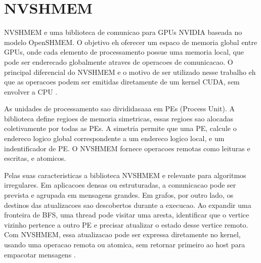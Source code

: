 \documentclass{article}
\begin{document}
\section{NVSHMEM}
NVSHMEM e uma biblioteca de comunicao para GPUs NVIDIA baseada no modelo OpenSHMEM. 
O objetivo eh oferecer um espaco de memoria global entre GPUs, onde cada elemento de 
processamento possue uma memoria local, que pode ser enderecado globalmente atraves de
operacoes de comunicacao. O principal diferencial do NVSHMEM e o motivo de ser utilizado
nesse trabalho eh que as operacoes podem ser emitidas diretamente de um kernel CUDA,
sem envolver a CPU \cite{hsunvshmem}.

As unidades de processamento sao divididasaaa em PEs (Process Unit). A biblioteca define
regioes de memoria simetricas, essas regioes sao alocadas coletivamente por todas as PEs.
A simetria permite que uma PE, calcule o endereco logico global correspondente a um
endereco logico local, e um indentificador de PE. O NVSHMEM fornece operacoes remotas
como leituras e escritas, e atomicos.

Pelas suas caracteristicas a biblioteca NVSHMEM e relevante para algoritmos irregulares.
Em aplicacoes densas ou estruturadas, a comunicacao pode ser prevista e agrupada
em mensagens grandes. Em grafos, por outro lado, os destinos das atualizacoes
sao descobertos durante a execucao. Ao expandir uma fronteira de BFS, uma thread
pode visitar uma aresta, identificar que o vertice vizinho pertence a outro PE e
precisar atualizar o estado desse vertice remoto. Com NVSHMEM, essa atualizacao
pode ser expressa diretamente no kernel, usando uma operacao remota ou atomica,
sem retornar primeiro ao host para empacotar mensagens \cite{hsunvshmem}.





\end{document}
